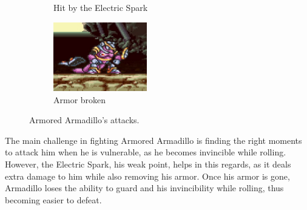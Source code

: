 \begin{figure}[htp]
\begin{subfigure}{0.35\textwidth}
			\caption{Hit by the Electric Spark}
		\end{subfigure}
		\begin{subfigure}{0.35\textwidth}
			\centering
			\includegraphics[height=3cm]{figures/X1/Armored_armadillo/Armadillo_shock_2.jpg}
			\caption{Armor broken}
		\end{subfigure}
		\caption{Armored Armadillo's attacks.}

\end{figure}

The main challenge in fighting Armored Armadillo is finding the right moments to attack him when he is vulnerable, as he becomes invincible while rolling. However, the Electric Spark, his weak point, helps in this regards, as it deals extra damage to him while also removing his armor. Once his armor is gone, Armadillo loses the ability to guard and his invincibility while rolling, thus becoming easier to defeat.

